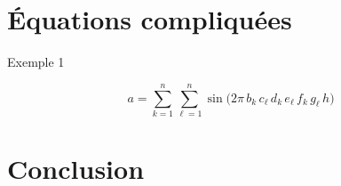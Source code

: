 \section{Équations compliquées}

Exemple 1

\begin{equation}
a = \sum_{k=1}^n\sum_{\ell=1}^n
\sin \bigl(2\pi \, b_k \,
c_{\ell} \, d_k \, e_{\ell} \,
f_k \, g_{\ell} \, h \bigr)
\end{equation}


\vspace{1cm}









\section{Conclusion}